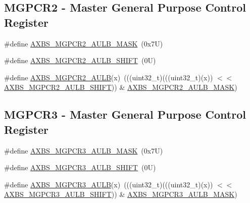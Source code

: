 \subsection*{M\+G\+P\+C\+R2 -\/ Master General Purpose Control Register}
\begin{DoxyCompactItemize}
\item 
\#define \mbox{\hyperlink{group___a_x_b_s___register___masks_ga454fa34b9ad3a689e961506a253e3775}{A\+X\+B\+S\+\_\+\+M\+G\+P\+C\+R2\+\_\+\+A\+U\+L\+B\+\_\+\+M\+A\+SK}}~(0x7\+U)
\item 
\#define \mbox{\hyperlink{group___a_x_b_s___register___masks_ga0e4aa4214fd104e88a02473e0bf30c7f}{A\+X\+B\+S\+\_\+\+M\+G\+P\+C\+R2\+\_\+\+A\+U\+L\+B\+\_\+\+S\+H\+I\+FT}}~(0\+U)
\item 
\#define \mbox{\hyperlink{group___a_x_b_s___register___masks_ga9047bce6c6e5493c18263bab8fc48b34}{A\+X\+B\+S\+\_\+\+M\+G\+P\+C\+R2\+\_\+\+A\+U\+LB}}(x)~(((uint32\+\_\+t)(((uint32\+\_\+t)(x)) $<$$<$ \mbox{\hyperlink{group___a_x_b_s___register___masks_ga0e4aa4214fd104e88a02473e0bf30c7f}{A\+X\+B\+S\+\_\+\+M\+G\+P\+C\+R2\+\_\+\+A\+U\+L\+B\+\_\+\+S\+H\+I\+FT}})) \& \mbox{\hyperlink{group___a_x_b_s___register___masks_ga454fa34b9ad3a689e961506a253e3775}{A\+X\+B\+S\+\_\+\+M\+G\+P\+C\+R2\+\_\+\+A\+U\+L\+B\+\_\+\+M\+A\+SK}})
\end{DoxyCompactItemize}
\subsection*{M\+G\+P\+C\+R3 -\/ Master General Purpose Control Register}
\begin{DoxyCompactItemize}
\item 
\#define \mbox{\hyperlink{group___a_x_b_s___register___masks_ga32728cb5c7a9e5bb1d40e3ae1842fa33}{A\+X\+B\+S\+\_\+\+M\+G\+P\+C\+R3\+\_\+\+A\+U\+L\+B\+\_\+\+M\+A\+SK}}~(0x7\+U)
\item 
\#define \mbox{\hyperlink{group___a_x_b_s___register___masks_gad9320811473f8962f040b6f8bb2b2bf8}{A\+X\+B\+S\+\_\+\+M\+G\+P\+C\+R3\+\_\+\+A\+U\+L\+B\+\_\+\+S\+H\+I\+FT}}~(0\+U)
\item 
\#define \mbox{\hyperlink{group___a_x_b_s___register___masks_gaa1a9d435c8f13c30b3d781dd19a71ec6}{A\+X\+B\+S\+\_\+\+M\+G\+P\+C\+R3\+\_\+\+A\+U\+LB}}(x)~(((uint32\+\_\+t)(((uint32\+\_\+t)(x)) $<$$<$ \mbox{\hyperlink{group___a_x_b_s___register___masks_gad9320811473f8962f040b6f8bb2b2bf8}{A\+X\+B\+S\+\_\+\+M\+G\+P\+C\+R3\+\_\+\+A\+U\+L\+B\+\_\+\+S\+H\+I\+FT}})) \& \mbox{\hyperlink{group___a_x_b_s___register___masks_ga32728cb5c7a9e5bb1d40e3ae1842fa33}{A\+X\+B\+S\+\_\+\+M\+G\+P\+C\+R3\+\_\+\+A\+U\+L\+B\+\_\+\+M\+A\+SK}})
\end{DoxyCompactItemize}
